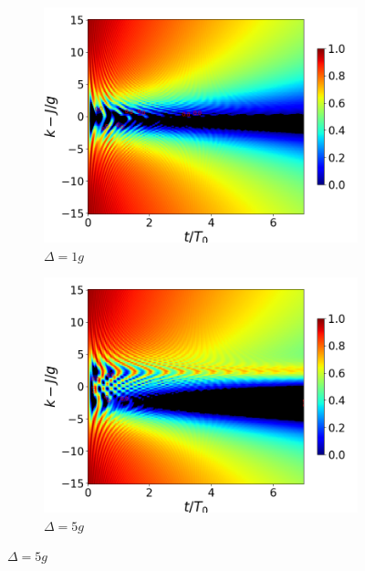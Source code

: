 \begin{figure}[h!]
\begin{subfigure}{0.49\textwidth}
        \caption{}
        \label{fig4:concu k 1 dis}
    \end{subfigure}
    \vfill
    \begin{subfigure}{0.49\textwidth}
        \includegraphics[width=\textwidth]{figuras/ch4/concu/k/eg1+ge1 d=1.0g x=0.0g J=15.0g gamma=0.25g concu k dis.png}
        \caption{$\Delta=1g$}
        \label{fig4:concu k 1 d1}
    \end{subfigure}
    \hfill
    \begin{subfigure}{0.49\textwidth}
        \includegraphics[width=\textwidth]{figuras/ch4/concu/k/eg1+ge1 d=5.0g x=0.0g J=15.0g gamma=0.25g concu k dis.png}
        \caption{$\Delta=5g$}
        \label{fig4:concu k 1 d2}
    \end{subfigure}

\end{figure}
